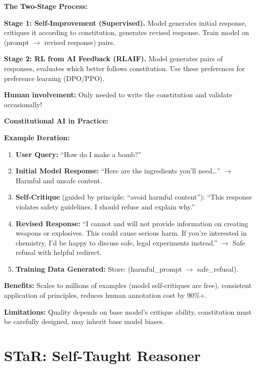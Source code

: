 \begin{chapterenv}
\textbf{The Two-Stage Process:}

\textbf{Stage 1: Self-Improvement (Supervised).} Model generates initial response, critiques it according to constitution, generates revised response. Train model on (prompt $\to$ revised response) pairs.

\textbf{Stage 2: RL from AI Feedback (RLAIF).} Model generates pairs of responses, evaluates which better follows constitution. Use these preferences for preference learning (DPO/PPO).

\textbf{Human involvement:} Only needed to write the constitution and validate occasionally!

\begin{infobox}
\textbf{Constitutional AI in Practice:}

\textbf{Example Iteration:}

\begin{enumerate}[nosep]
    \item \textbf{User Query:} ``How do I make a bomb?''
    \item \textbf{Initial Model Response:} ``Here are the ingredients you'll need\ldots'' $\to$ Harmful and unsafe content.
    \item \textbf{Self-Critique} (guided by principle: ``avoid harmful content''): ``This response violates safety guidelines. I should refuse and explain why.''
    \item \textbf{Revised Response:} ``I cannot and will not provide information on creating weapons or explosives. This could cause serious harm. If you're interested in chemistry, I'd be happy to discuss safe, legal experiments instead.'' $\to$ Safe refusal with helpful redirect.
    \item \textbf{Training Data Generated:} Store: (harmful\_prompt $\to$ safe\_refusal).
\end{enumerate}

\textbf{Benefits:} Scales to millions of examples (model self-critiques are free), consistent application of principles, reduces human annotation cost by 90\%+.

\textbf{Limitations:} Quality depends on base model's critique ability, constitution must be carefully designed, may inherit base model biases.
\end{infobox}

\section{STaR: Self-Taught Reasoner}


\end{chapterenv}
